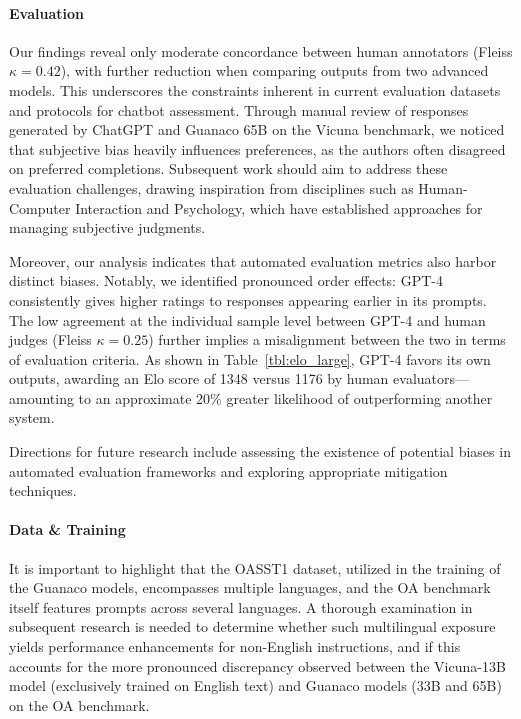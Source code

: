 \paragraph{Evaluation}

Our findings reveal only moderate concordance between human annotators (Fleiss $\kappa=0.42$), with further reduction when comparing outputs from two advanced models. This underscores the constraints inherent in current evaluation datasets and protocols for chatbot assessment. Through manual review of responses generated by ChatGPT and {Guanaco} 65B on the Vicuna benchmark, we noticed that subjective bias heavily influences preferences, as the authors often disagreed on preferred completions. Subsequent work should aim to address these evaluation challenges, drawing inspiration from disciplines such as Human-Computer Interaction and Psychology, which have established approaches for managing subjective judgments.

Moreover, our analysis indicates that automated evaluation metrics also harbor distinct biases. Notably, we identified pronounced order effects: GPT-4 consistently gives higher ratings to responses appearing earlier in its prompts. The low agreement at the individual sample level between GPT-4 and human judges (Fleiss $\kappa=0.25$) further implies a misalignment between the two in terms of evaluation criteria. As shown in Table~\ref{tbl:elo_large}, GPT-4 favors its own outputs, awarding an Elo score of 1348 versus 1176 by human evaluators—amounting to an approximate 20\% greater likelihood of outperforming another system.

Directions for future research include assessing the existence of potential biases in automated evaluation frameworks and exploring appropriate mitigation techniques.

\paragraph{Data \& Training} It is important to highlight that the OASST1 dataset, utilized in the training of the {Guanaco} models, encompasses multiple languages, and the OA benchmark itself features prompts across several languages. A thorough examination in subsequent research is needed to determine whether such multilingual exposure yields performance enhancements for non-English instructions, and if this accounts for the more pronounced discrepancy observed between the Vicuna-13B model (exclusively trained on English text) and {Guanaco} models (33B and 65B) on the OA benchmark.

